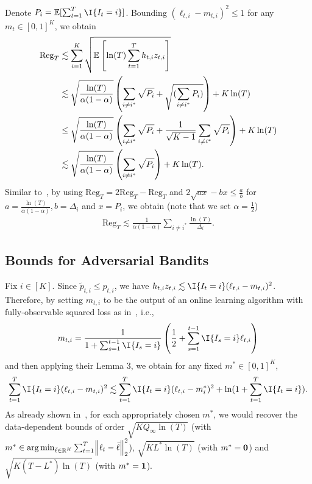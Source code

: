 Denote $P_{i} = \E[\sum_{t=1}^T \I{I_t = i}]$. Bounding $(\ell_{t,i} - m_{t,i})^2 \leq 1$ for any $m_{t} \in [0,1]^K$, we obtain 
\begin{align*}
    \mathrm{Reg}_T &\lesssim \sum_{i=1}^K \sqrt{\mathbb{E}\left[\ln(T)\sum_{t=1}^T h_{t,i} z_{t,i}\right]} \\
    &\lesssim \sqrt{\frac{\ln(T)}{\alpha(1-\alpha)}} \left(\sum_{i \neq i^*}\sqrt{P_i} + \sqrt{(\sum_{i \neq i^*} P_i)}\right) + K\ln(T) \\
    &\leq \sqrt{\frac{\ln(T)}{\alpha(1-\alpha)}} \left(\sum_{i \neq i^*}\sqrt{P_i} + \frac{1}{\sqrt{K-1}}\sum_{i \neq i^*}\sqrt{P_i}\right) + K\ln(T) \\
    &\lesssim \sqrt{\frac{\ln(T)}{\alpha(1-\alpha)}} \left(\sum_{i \neq i^*} \sqrt{P_i}  \right) + K\ln(T).
\end{align*}
Similar to~\cite{ItoCOLT2022aVariance}, by using $\mathrm{Reg}_T = 2\mathrm{Reg}_T  - \mathrm{Reg}_T$ and $2\sqrt{ax} - bx \leq \frac{a}{b}$ for $a = \frac{\ln(T)}{\alpha(1-\alpha)}, b = \Delta_i$ and $x = P_i$, we obtain (note that we set $\alpha = \frac{1}{2}$)
\begin{align*}
    \mathrm{Reg}_T \lesssim \frac{1}{\alpha (1-\alpha)}\sum_{i \neq i^*}\frac{ \ln(T) }{\Delta_i}.
\end{align*}

\subsection*{Bounds for Adversarial Bandits}
Fix $i \in [K]$. Since $\tilde{p}_{t,i} \leq p_{t,i}$, we have $h_{t,i}z_{t,i} \lesssim \I{I_t = i}(\ell_{t,i} - m_{t,i})^2$. 
Therefore, by setting $m_{t,i}$ to be the output of an online learning algorithm with fully-observable squared loss as in~\cite{ItoCOLT2022aVariance}, i.e.,
\begin{align*}
    m_{t,i} = \frac{1}{1 + \sum_{s=1}^{t-1}\I{I_s = i}}\left(\frac{1}{2} + \sum_{s=1}^{t-1} \I{I_s = i} \ell_{t,i}\right)
\end{align*}
and then applying their Lemma 3, we obtain for any fixed $m^{*} \in [0,1]^K$,
\begin{align*}
    \sum_{t=1}^T \I{I_t = i}(\ell_{t,i} - m_{t,i})^2 \lesssim \sum_{t=1}^T \I{I_t = i}(\ell_{t,i} - m^{*}_{i})^2 + \ln(1 + \sum_{t=1}^T \I{I_t = i}).
\end{align*}
As already shown in~\cite{ItoCOLT2022aVariance}, for each appropriately chosen $m^{*}$, we would recover the data-dependent bounds of order $\sqrt{KQ_\infty \ln(T)}$ (with $m^* \in \operatorname*{arg\,min}_{\bar{\ell} \in \mathbb{R}^K}\sum_{t=1}^T \norm{\ell_t - \bar{\ell}}_2^2$), $\sqrt{KL^*\ln(T)}$ (with $m^* = \mathbf{0}$) and $\sqrt{K(T-L^*)\ln(T)}$ (with $m^* = \bm{1}$).



